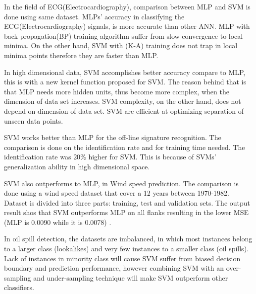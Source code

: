 
In the field of ECG(Electrocardiography), comparison between MLP and SVM is done using same dataset. MLPs' accuracy in classifying the ECG(Electrocardiography) signals, is more accurate than other ANN. MLP with back propagation(BP) training algorithm suffer from slow convergence to local minima. On the other hand, SVM with (K-A) training does not trap in local minima points therefore they are faster than MLP\cite{Moavenian20103088}.

In high dimensional data, SVM accomplishes better accuracy compare to MLP, this is with a new kernel function proposed for SVM. The reason behind that is that MLP needs more hidden units, thus become more complex, when the dimension of data set increases. SVM complexity, on the other hand, does not depend on dimension of data set. SVM are efficient at optimizing separation of unseen data points\cite{Zanaty2012177}.

SVM works better than MLP for the off-line signature recognition. The comparison is done on the identification rate and for training time needed. The identification rate was $20$\% higher for SVM. This is because of SVMs' generalization ability in high dimensional space\cite{FriasMartinez2006693}.

SVM also outperforms to MLP, in Wind speed prediction. The comparison is done using a wind speed dataset that cover a 12 years between 1970-1982. Dataset is divided into three parts: training, test and validation sets. The output result shos that SVM outperforms MLP on all flanks resulting in the lower MSE (MLP is 0.0090 while it is 0.0078) \cite{Mohandes2004939}.

In oil spill detection, the datasets are imbalanced, in which most instances belong to a larger class (lookalikes) and very few instances to a smaller class (oil spills). Lack of instances in minority class will cause SVM suffer from biased decision boundary and prediction performance, however combining SVM with an over-sampling and under-sampling technique will make SVM outperform other classifiers\cite{liu2006boosting}.

